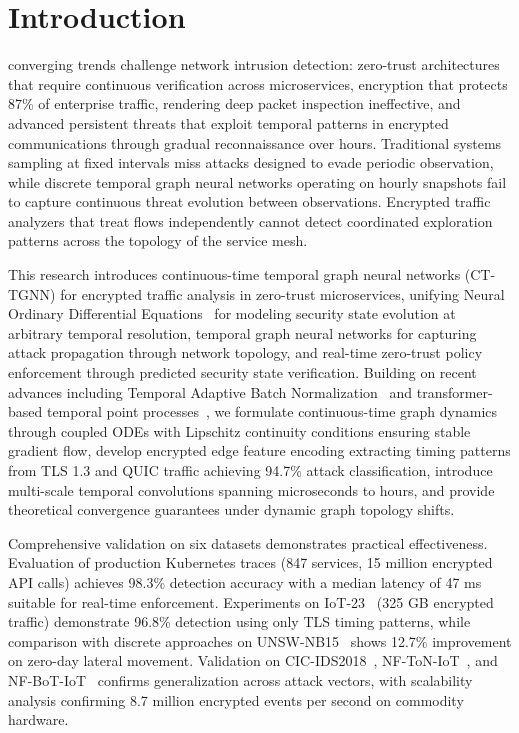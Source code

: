 \documentclass[lettersize,journal]{IEEEtran}
\begin{document}
\section{Introduction}
\label{sec:introduction}

 converging trends challenge network intrusion detection: zero-trust architectures that require continuous verification across microservices, encryption that protects 87\% of enterprise traffic, rendering deep packet inspection ineffective, and advanced persistent threats that exploit temporal patterns in encrypted communications through gradual reconnaissance over hours. Traditional systems sampling at fixed intervals miss attacks designed to evade periodic observation, while discrete temporal graph neural networks operating on hourly snapshots fail to capture continuous threat evolution between observations. Encrypted traffic analyzers that treat flows independently cannot detect coordinated exploration patterns across the topology of the service mesh.

This research introduces continuous-time temporal graph neural networks (CT-TGNN) for encrypted traffic analysis in zero-trust microservices, unifying Neural Ordinary Differential Equations~\cite{chen2018neural} for modeling security state evolution at arbitrary temporal resolution, temporal graph neural networks for capturing attack propagation through network topology, and real-time zero-trust policy enforcement through predicted security state verification. Building on recent advances including Temporal Adaptive Batch Normalization~\cite{salvi2024tabn} and transformer-based temporal point processes~\cite{zuo2020transformer, aandt2025transformer}, we formulate continuous-time graph dynamics through coupled ODEs with Lipschitz continuity conditions ensuring stable gradient flow, develop encrypted edge feature encoding extracting timing patterns from TLS 1.3 and QUIC traffic achieving 94.7\% attack classification, introduce multi-scale temporal convolutions spanning microseconds to hours, and provide theoretical convergence guarantees under dynamic graph topology shifts.

Comprehensive validation on six datasets demonstrates practical effectiveness. Evaluation of production Kubernetes traces (847 services, 15 million encrypted API calls) achieves 98.3\% detection accuracy with a median latency of 47 ms suitable for real-time enforcement. Experiments on IoT-23~\cite{garcia2020iot23} (325 GB encrypted traffic) demonstrate 96.8\% detection using only TLS timing patterns, while comparison with discrete approaches on UNSW-NB15~\cite{moustafa2015unsw} shows 12.7\% improvement on zero-day lateral movement. Validation on CIC-IDS2018~\cite{sharafaldin2018cic}, NF-ToN-IoT~\cite{sarhan2022nf}, and NF-BoT-IoT~\cite{sarhan2021netflow} confirms generalization across attack vectors, with scalability analysis confirming 8.7 million encrypted events per second on commodity hardware.
\end{document}
